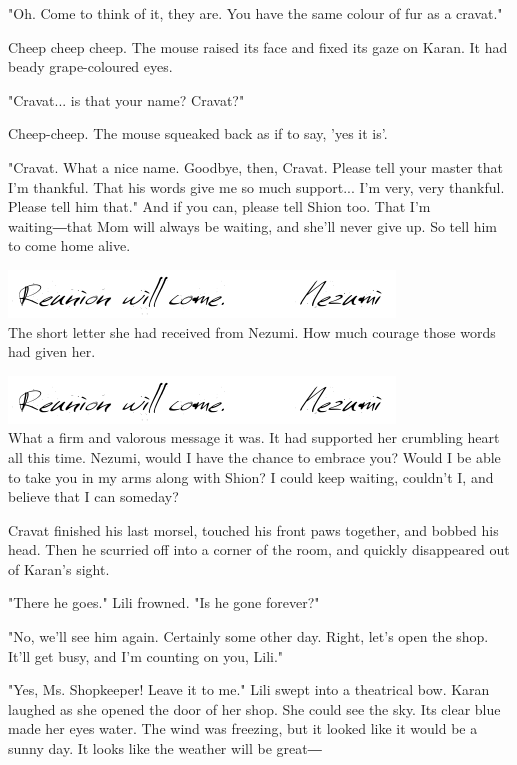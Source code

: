 "Oh. Come to think of it, they are. You have the same colour of fur as a
cravat."

Cheep cheep cheep. The mouse raised its face and fixed its gaze on
Karan. It had beady grape-coloured eyes.

"Cravat... is that your name? Cravat?"

Cheep-cheep. The mouse squeaked back as if to say, 'yes it is'.

"Cravat. What a nice name. Goodbye, then, Cravat. Please tell your
master that I'm thankful. That his words give me so much support... I'm
very, very thankful. Please tell him that." And if you can, please tell
Shion too. That I'm waiting―that Mom will always be waiting, and she'll
never give up. So tell him to come home alive.

\includegraphics{Images/memo7.png}\\

The short letter she had received from Nezumi. How much courage those
words had given her.

\includegraphics{Images/memo7.png}\\

What a firm and valorous message it was. It had supported her crumbling
heart all this time. Nezumi, would I have the chance to embrace you?
Would I be able to take you in my arms along with Shion? I could keep
waiting, couldn't I, and believe that I can someday?

Cravat finished his last morsel, touched his front paws together, and
bobbed his head. Then he scurried off into a corner of the room, and
quickly disappeared out of Karan's sight.

"There he goes." Lili frowned. "Is he gone forever?"

"No, we'll see him again. Certainly some other day. Right, let's open
the shop. It'll get busy, and I'm counting on you, Lili."

"Yes, Ms. Shopkeeper! Leave it to me." Lili swept into a theatrical bow.
Karan laughed as she opened the door of her shop. She could see the sky.
Its clear blue made her eyes water. The wind was freezing, but it looked
like it would be a sunny day. It looks like the weather will be great―

